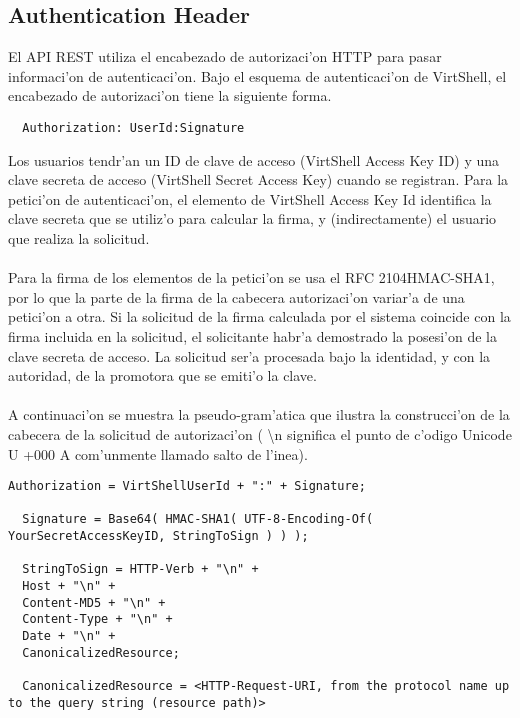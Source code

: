 \subsection{Authentication Header}

El API REST utiliza el encabezado de autorizaci'on HTTP para pasar informaci'on de autenticaci'on. Bajo el esquema de autenticaci'on de VirtShell, el encabezado de autorizaci'on tiene la siguiente forma.

\medskip
\begin{lstlisting}
  Authorization: UserId:Signature
\end{lstlisting}
\medskip

Los usuarios tendr'an un ID de clave de acceso (VirtShell Access Key ID) y una clave secreta de acceso (VirtShell Secret Access Key) cuando se registran. Para la petici'on de autenticaci'on, el elemento de VirtShell Access Key Id identifica la clave secreta que se utiliz'o para calcular la firma, y (indirectamente) el usuario que realiza la solicitud.\\
\\
Para la firma de los elementos de la petici'on se usa el RFC 2104HMAC-SHA1, por lo que la parte de la firma de la cabecera autorizaci'on variar'a de una petici'on a otra. Si la solicitud de la firma calculada por el sistema coincide con la firma incluida en la solicitud, el solicitante habr'a demostrado la posesi'on de la clave secreta de acceso. La solicitud ser'a procesada bajo la identidad, y con la autoridad, de la promotora que se emiti'o la clave.\\
\\
A continuaci'on se muestra la pseudo-gram'atica que ilustra la construcci'on de la cabecera de la solicitud de autorizaci'on (
\textbackslash{}n significa el punto de c'odigo Unicode U +000 A com'unmente llamado salto de l'inea).

\medskip
\begin{lstlisting}[basicstyle=\tiny]
  Authorization = VirtShellUserId + ":" + Signature;

  Signature = Base64( HMAC-SHA1( UTF-8-Encoding-Of( YourSecretAccessKeyID, StringToSign ) ) );

  StringToSign = HTTP-Verb + "\n" +
  Host + "\n" +
  Content-MD5 + "\n" +
  Content-Type + "\n" +
  Date + "\n" +
  CanonicalizedResource;

  CanonicalizedResource = <HTTP-Request-URI, from the protocol name up to the query string (resource path)>
\end{lstlisting}

